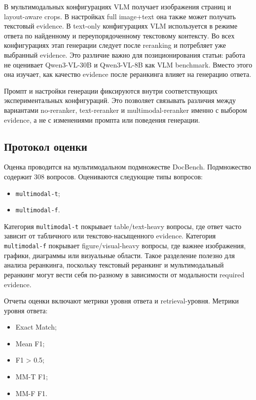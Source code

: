 \documentclass[conference]{IEEEtran}
\begin{document}
В мультимодальных конфигурациях VLM получает изображения страниц и layout-aware crops. В настройках full image+text она также может получать текстовый evidence. В text-only конфигурациях VLM используется в режиме ответа по найденному и переупорядоченному текстовому контексту. Во всех конфигурациях этап генерации следует после reranking и потребляет уже выбранный evidence. Это различие важно для позиционирования статьи: работа не оценивает Qwen3-VL-30B и Qwen3-VL-8B как VLM benchmark. Вместо этого она изучает, как качество evidence после реранкинга влияет на генерацию ответа.

Промпт и настройки генерации фиксируются внутри соответствующих экспериментальных конфигураций. Это позволяет связывать различия между вариантами no-reranker, text-reranker и multimodal-reranker именно с выбором evidence, а не с изменениями промпта или поведения генерации.

\subsection{Протокол оценки}

Оценка проводится на мультимодальном подмножестве DocBench. Подмножество содержит 308 вопросов. Оцениваются следующие типы вопросов:

\begin{itemize}
\item \texttt{multimodal-t};
\item \texttt{multimodal-f}.
\end{itemize}

Категория \texttt{multimodal-t} покрывает table/text-heavy вопросы, где ответ часто зависит от табличного или текстово-насыщенного evidence. Категория \texttt{multimodal-f} покрывает figure/visual-heavy вопросы, где важнее изображения, графики, диаграммы или визуальные области. Такое разделение полезно для анализа реранкинга, поскольку текстовый реранкинг и мультимодальный реранкинг могут вести себя по-разному в зависимости от модальности required evidence.

Отчеты оценки включают метрики уровня ответа и retrieval-уровня. Метрики уровня ответа:

\begin{itemize}
\item Exact Match;
\item Mean F1;
\item F1 > 0.5;
\item MM-T F1;
\item MM-F F1.
\end{itemize}
\end{document}
